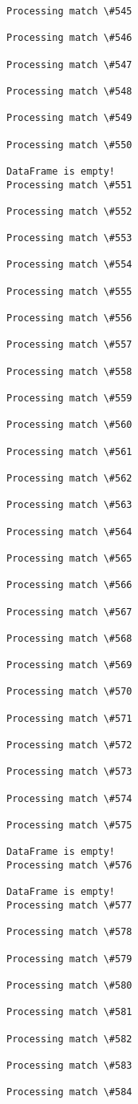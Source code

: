 \documentclass[11pt]{article}
\begin{document}
\begin{Verbatim}[commandchars=\\\{\}]
Processing match \#545

Processing match \#546

Processing match \#547

Processing match \#548

Processing match \#549

Processing match \#550

DataFrame is empty!
Processing match \#551

Processing match \#552

Processing match \#553

Processing match \#554

Processing match \#555

Processing match \#556

Processing match \#557

Processing match \#558

Processing match \#559

Processing match \#560

Processing match \#561

Processing match \#562

Processing match \#563

Processing match \#564

Processing match \#565

Processing match \#566

Processing match \#567

Processing match \#568

Processing match \#569

Processing match \#570

Processing match \#571

Processing match \#572

Processing match \#573

Processing match \#574

Processing match \#575

DataFrame is empty!
Processing match \#576

DataFrame is empty!
Processing match \#577

Processing match \#578

Processing match \#579

Processing match \#580

Processing match \#581

Processing match \#582

Processing match \#583

Processing match \#584


\end{Verbatim}
\end{document}
